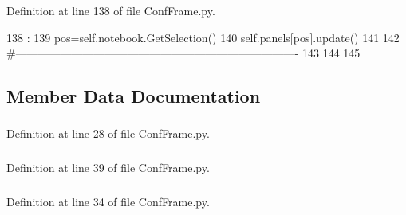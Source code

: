 Definition at line 138 of file ConfFrame.py.


\begin{DoxyCode}
138                     :
139         pos=self.notebook.GetSelection()
140         self.panels[pos].update()
141         
142 #----------------------------------------------------------------------------
143 
144 
145 

\end{DoxyCode}


\subsection{Member Data Documentation}
\hypertarget{classConfFrame_1_1ConfFrame_af1c49c5895361f1a69479b4686303ece}{
\subsubsection[{app}]{}}
\label{classConfFrame_1_1ConfFrame_af1c49c5895361f1a69479b4686303ece}


Definition at line 28 of file ConfFrame.py.\hypertarget{classConfFrame_1_1ConfFrame_a9975a400261ad1baff3cbf44bcc8d7b2}{
\subsubsection[{confs}]{}}
\label{classConfFrame_1_1ConfFrame_a9975a400261ad1baff3cbf44bcc8d7b2}


Definition at line 39 of file ConfFrame.py.\hypertarget{classConfFrame_1_1ConfFrame_a95a7738a968b728d6d71cf02cd0ce135}{
\subsubsection[{notebook}]{}}
\label{classConfFrame_1_1ConfFrame_a95a7738a968b728d6d71cf02cd0ce135}


Definition at line 34 of file ConfFrame.py.\hypertarget{classConfFrame_1_1ConfFrame_a938607c801e07bb6b9cfbb78ce53fb92}{
\subsubsection[{objs}]{}}
\label{classConfFrame_1_1ConfFrame_a938607c801e07bb6b9cfbb78ce53fb92}


